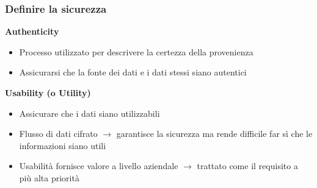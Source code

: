 \begin{frame}
  \frametitle{Definire la sicurezza}
   \textbf{Authenticity}
  	\begin{itemize}[<+- | alert@+>]
  	\item Processo utilizzato per descrivere la certezza della provenienza
  	\item Assicurarsi che la fonte dei dati e i dati stessi siano autentici
  	\end{itemize}
  	\pause
  \textbf{Usability (o Utility)}
  \begin{itemize}[<+- | alert@+>]
  \item Assicurare che i dati siano utilizzabili
  \item Flusso di dati cifrato $\rightarrow$ garantisce la sicurezza ma rende difficile far sì che le informazioni siano utili
  \item Usabilità fornisce valore a livello aziendale $\rightarrow$ trattato come il requisito a più alta priorità
  \end{itemize}
\end{frame}


